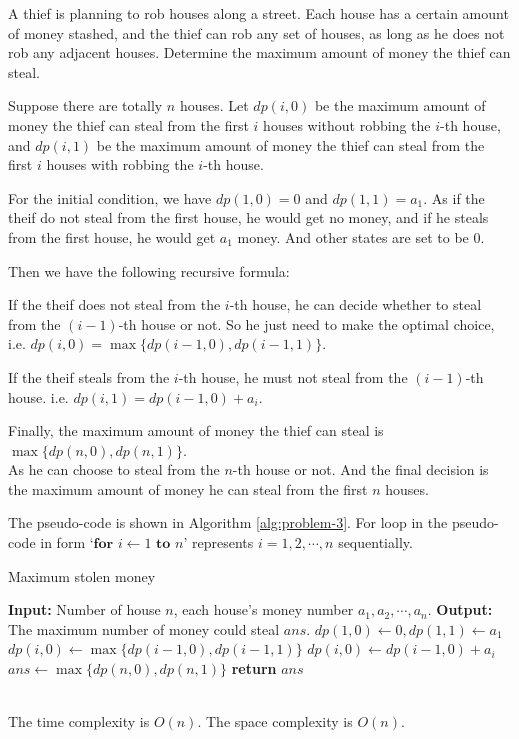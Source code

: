 \problem{}
A thief is planning to rob houses along a street. Each house has a certain amount of money stashed, and the thief can rob any set of houses, as long as he does not rob any adjacent houses.  Determine the maximum amount of money the thief can steal.
\solution{}

Suppose there are totally $n$ houses. Let $dp(i,0)$ be the maximum amount of money the thief can steal from the first $i$ houses without robbing the $i$-th house, and $dp(i,1)$ be the maximum amount of money the thief can steal from the first $i$ houses with robbing the $i$-th house.

For the initial condition, we have $dp(1,0)=0$ and $dp(1,1)=a_1$. As if the theif do not steal from the first house, he would get no money, and if he steals from the first house, he would get $a_1$ money.
And other states are set to be $0$. 

Then we have the following recursive formula:

If the theif does not steal from the $i$-th house, he can decide whether to steal from the $(i-1)$-th house or not. So he just need to make the optimal choice,
i.e. $dp(i,0)=\max\{dp(i-1,0),dp(i-1,1)\}$.

If the theif steals from the $i$-th house, he must not steal from the $(i-1)$-th house. i.e. $dp(i,1)=dp(i-1,0)+a_i$.

Finally, the maximum amount of money the thief can steal is $\max\{dp(n,0),dp(n,1)\}$.\\
As he can choose to steal from the $n$-th house or not. And the final decision is the maximum amount of money he can steal from the first $n$ houses.

The pseudo-code is shown in Algorithm \ref{alg:problem-3}. For loop in the pseudo-code in form `$\textbf{for } i \gets 1 \textbf{ to } n$' represents $i=1,2,\cdots,n$ sequentially.
\begin{algorithm}
    \caption{Maximum stolen money}
    \begin{algorithmic}[1]
    \State \textbf{Input:} Number of house $n$, each house's money number $a_1, a_2, \cdots, a_n$. 
    \State \textbf{Output:} The maximum number of money could steal $ans$.
    \State $dp(1,0) \gets 0, dp(1,1)\gets a_1$
        \State $dp(i,0) \gets \max\{dp(i-1,0),dp(i-1,1)\}$
        \State $dp(i,0) \gets dp(i-1,0)+a_i$
    \EndFor
    \State $ans \gets \max\{dp(n,0),dp(n,1)\}$
    \State \textbf{return} $ans$
    \end{algorithmic}
    \label{alg:problem-3}
\end{algorithm}\\
The time complexity is $O(n)$.
The space complexity is $O(n)$.

\newpage